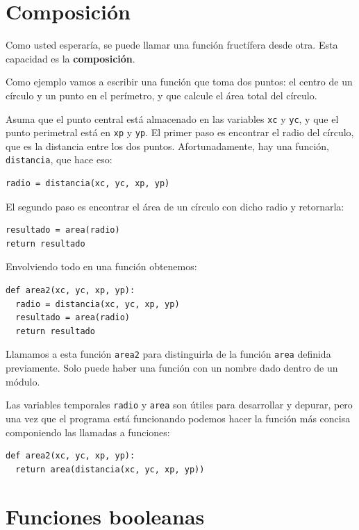 \section{Composición}

 

Como usted esperaría, se puede llamar una función fructífera desde
otra. Esta capacidad es la \textbf{composición}.

Como ejemplo vamos a escribir una función que toma dos puntos: el
centro de un círculo y un punto en el perímetro, y que calcule el
área total del círculo.

Asuma que el punto central está almacenado en las variables \texttt{xc}
y \texttt{yc}, y que el punto perimetral está en \texttt{xp} y \texttt{yp}.
El primer paso es encontrar el radio del círculo, que es la distancia
entre los dos puntos. Afortunadamente, hay una función, \texttt{distancia},
que hace eso:

\begin{verbatim}
radio = distancia(xc, yc, xp, yp)
\end{verbatim}

El segundo paso es encontrar el área de un círculo con dicho radio
y retornarla:

\begin{verbatim}
resultado = area(radio)
return resultado
\end{verbatim}
 Envolviendo todo en una función obtenemos:

\begin{verbatim}
def area2(xc, yc, xp, yp):
  radio = distancia(xc, yc, xp, yp)
  resultado = area(radio)
  return resultado
\end{verbatim}
Llamamos a esta función \texttt{area2} para distinguirla de la función
\texttt{area} definida previamente. Solo puede haber una función con
un nombre dado dentro de un módulo.

Las variables temporales \texttt{radio} y \texttt{area} son útiles
para desarrollar y depurar, pero una vez que el programa está funcionando
podemos hacer la función más concisa componiendo las llamadas a funciones:

\begin{verbatim}
def area2(xc, yc, xp, yp):
  return area(distancia(xc, yc, xp, yp))
\end{verbatim}

\section{Funciones booleanas}

